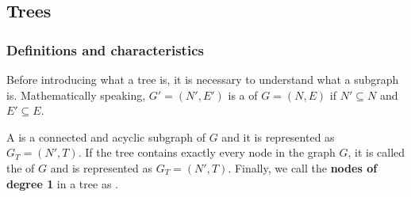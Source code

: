 \subsection{Trees}

\subsubsection{Definitions and characteristics}

Before introducing what a tree is, it is necessary to understand what a subgraph is. Mathematically speaking, $G'= \left(N', E'\right)$ is a  of $G = \left(N,E\right)$ if $N' \subseteq N$ and $E' \subseteq E$.

\highspace
A  is a connected and acyclic subgraph of $G$ and it is represented as $G_{T} = \left(N', T\right)$. If the tree contains exactly every node in the graph $G$, it is called the  of $G$ and is represented as $G_{T} = \left(N', T\right)$. Finally, we call the \textbf{nodes of degree 1} in a tree as .

